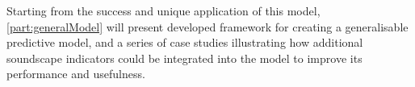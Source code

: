  Starting from the success and unique application of this model, \cref{part:generalModel} will present developed framework for creating a generalisable predictive model, and a series of case studies illustrating how additional soundscape indicators could be integrated into the model to improve its performance and usefulness.

